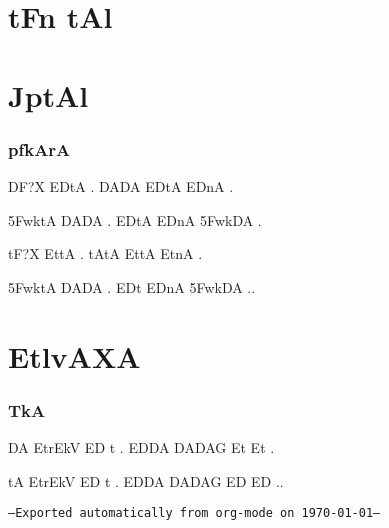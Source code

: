 \documentclass{tufte-book}
\begin{document}
{\dn\chapter{ tFn tAl}}

{\dn\chapter{ JptAl}}

\subsection{{\dn p\?fkArA}}
\noindent
{\dn 

DF?X ED\2tA . DADA ED\2tA ED\2nA .

\35FwktA DADA . ED\2tA ED\2nA \35FwkDA .

tF?X Et\2tA . tAtA Et\2tA Et\2nA .

\35FwktA DADA . ED\2t ED\2nA \35FwkDA ..
}

{\dn
\chapter{EtlvAXA}}
\subsection{{\dn T\?kA}}
\noindent
{\dn

DA EtrEkV ED\2 t . ED\2DA DADAG\? Et\2 Et\2 .

tA EtrEkV ED\2 t . ED\2DA DADAG\? ED\2 ED\2 ..
}

\vfill
\begin{center}
\texttt{--Exported automatically from org-mode on \today--}
\end{center}
\end{document}
